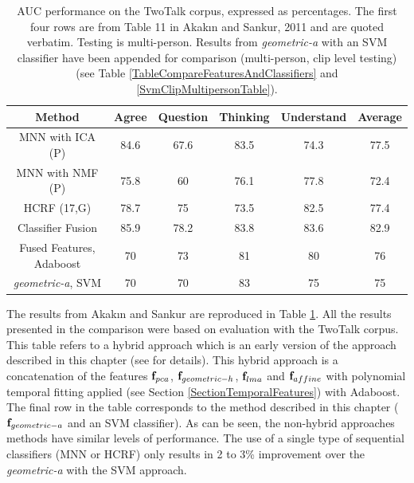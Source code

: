 \begin{table}[tb]
\centering
\caption[\ac{AUC} performance on the TwoTalk corpus, expressed as percentages.]{\ac{AUC} performance on the TwoTalk corpus, expressed as percentages. The first four rows are from Table 11 in Akak{\i}n and Sankur, 2011 \cite{Akakin2011} and are quoted verbatim. Testing is multi-person. Results from \textit{geometric-a} with an SVM classifier have been appended for comparison (multi-person, clip level testing) (see Table \ref{TableCompareFeaturesAndClassifiers} and \ref{SvmClipMultipersonTable}).}
\begin{tabular}{ c || c | c | c | c | c }
Method & Agree & Question & Thinking & Understand & Average \\
\hline
MNN with ICA (P) & 84.6 & 67.6 & 83.5 & 74.3 & 77.5 \\
MNN with NMF (P) & 75.8 & 60   & 76.1 & 77.8 & 72.4 \\
HCRF (17,G)      & 78.7 & 75   & 73.5 & 82.5 & 77.4 \\
Classifier Fusion & 85.9 & 78.2 & 83.8 & 83.6 & 82.9 \\
\hline
Fused Features, Adaboost & 70 & 73 & 81 & 80 & 76 \\
\textit{geometric-a}, SVM & 70 & 70 & 83 & 75 & 75 \\
\end{tabular}
\label{TableCompareToAkakin}
\end{table}

The results from Akak{\i}n and Sankur are reproduced in Table \ref{TableCompareToAkakin}. All the results presented in the comparison were based on evaluation with the TwoTalk corpus.
This table refers to a hybrid approach which is an early version of the approach described in this chapter (see \cite{SheermanChase2009} for details). This hybrid approach is a concatenation of the features $\textbf{f}_{pca}$, $\textbf{f}_{geometric-h}$, $\textbf{f}_{lma}$ and $\textbf{f}_{affine}$ with polynomial temporal fitting applied (see Section \ref{SectionTemporalFeatures}) with Adaboost. The final row in the table corresponds to the method described in this chapter ($\textbf{f}_{geometric-a}$ and an \ac{SVM} classifier). As can be seen, the non-hybrid approaches methods have similar levels of performance. The use of a single type of sequential classifiers (MNN or HCRF) only results in 2 to 3\% improvement over the \textit{geometric-a} with the \ac{SVM} approach. 

